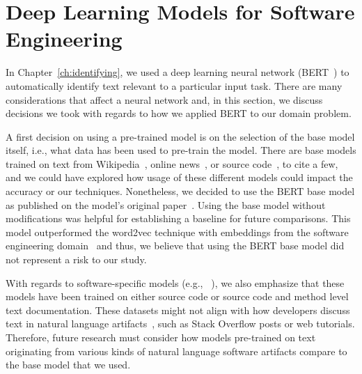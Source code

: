


\section{Deep Learning Models for Software Engineering}
\label{cp7:deep-learning}




In Chapter~\ref{ch:identifying}, we used a deep learning neural network (BERT~\cite{Devlin2018Bert})
to automatically identify text relevant to a particular input task. There are many considerations 
that affect a neural network and, in this section, we discuss decisions we took 
with regards to how we applied BERT to our domain problem. 




A first decision on using a pre-trained model is on the selection of the base model itself, i.e., what data has been used to pre-train the model. 
There are base models trained on text from Wikipedia~\cite{Devlin2018Bert},  online news~\cite{peters2018elmo}, 
or source code~\cite{feng2020-codebert}, to  cite a few,
and we could have explored how usage of these different models could impact the accuracy or our 
techniques. Nonetheless, we decided to use 
the BERT base model as published on the model's original paper~\cite{Devlin2018Bert}.
Using the base model without modifications
was helpful for establishing a baseline for future comparisons.
This model outperformed 
the word2vec technique with embeddings from the software engineering domain~\cite{Efstathiou2018}
and thus, we believe that using the BERT base model did not represent a risk to our study.




With regards to software-specific models (e.g., ~\cite{feng2020-codebert, li2019neural}), we also emphasize 
that these models have been trained on either source code or source code and method level text documentation. 
These datasets might not align with how developers discuss text in natural language artifacts~\cite{arya2020}, such 
as Stack Overflow posts or web tutorials. Therefore, future research must consider how 
 models pre-trained on text originating from various kinds of 
natural language software artifacts compare to the base model that we used.



